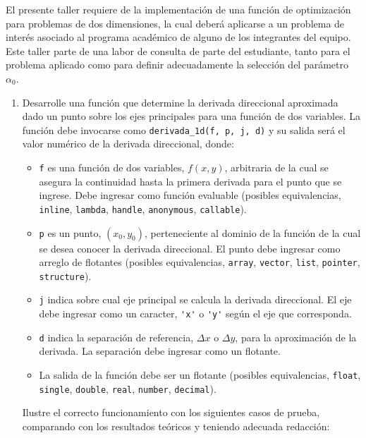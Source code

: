 \documentclass[12pt]{article}
\begin{document}
El presente taller requiere de la implementación de una función de optimización para problemas de dos dimensiones, la cual deberá aplicarse a un problema de interés asociado al programa académico de alguno de los integrantes del equipo. Este taller parte de una labor de consulta de parte del estudiante, tanto para el problema aplicado como para definir adecuadamente la selección del parámetro \(\alpha_0\).

\vspace{-.5cm}
  \begin{enumerate}[leftmargin=*,widest=9]


    \item Desarrolle una función que determine la derivada direccional aproximada dado un punto sobre los ejes principales para una función de dos variables. La función debe invocarse como \verb-derivada_1d(f, p, j, d)- y su salida será el valor numérico de la derivada direccional, donde:

    \begin{itemize}
        \item \verb-f- es una función de dos variables, \(f(x,y)\), arbitraria de la cual se asegura la continuidad hasta la primera derivada para el punto que se ingrese. Debe ingresar como función evaluable (posibles equivalencias, \verb-inline-, \verb-lambda-, \verb-handle-, \verb-anonymous-, \verb-callable-).
    \item \verb-p- es un punto, \((x_0,y_0)\), perteneciente al dominio de la función de la cual se desea conocer la derivada direccional. El punto debe ingresar como arreglo de flotantes (posibles equivalencias, \verb-array-, \verb-vector-, \verb-list-, \verb-pointer-, \verb-structure-).
    \item \verb-j- indica sobre cual eje principal se calcula la derivada direccional. El eje debe ingresar como un caracter, \verb-'x'- o \verb-'y'- según el eje que corresponda.
    \item \verb-d- indica la separación de referencia, \(\Delta x\) o \(\Delta y\), para la aproximación de la derivada. La separación debe ingresar como un flotante.
    \item La salida de la función debe ser un flotante (posibles equivalencias, \verb-float-, \verb-single-, \verb-double-, \verb-real-, \verb-number-, \verb-decimal-).
    \end{itemize}

Ilustre el correcto funcionamiento con los siguientes casos de prueba, comparando con los resultados teóricos y teniendo adecuada redacción:


\end{enumerate}
\end{document}
